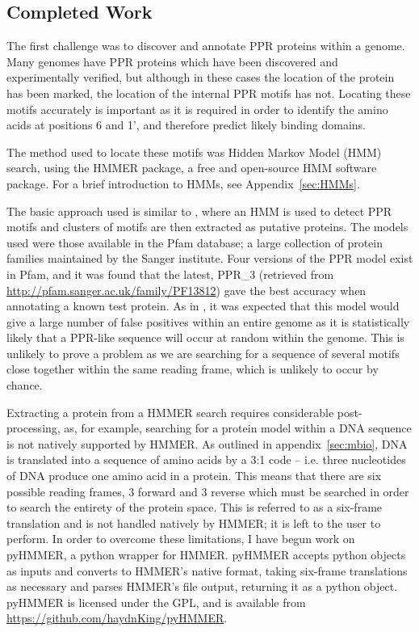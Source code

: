 \documentclass[twoside,a4paper]{article}
\begin{document}
\begin{multicols}{2}

\section{Completed Work}

The first challenge was to discover and annotate PPR proteins within a genome.
Many genomes have PPR proteins which have been discovered and experimentally
verified, but although in these cases the location of the protein has been
marked, the location of the internal PPR motifs has not.
Locating these motifs accurately is important as it is required in order to
identify the amino acids at positions 6 and 1', and therefore predict likely
binding domains.

The method used to locate these motifs was Hidden Markov Model (HMM) search, 
using the HMMER package, a free and open-source HMM software package.
For a brief introduction to HMMs, see Appendix~\ref{sec:HMMs}.

The basic approach used is similar to \cite{Lurin2004}, where an HMM is used to
detect PPR motifs and clusters of motifs are then extracted as putative
proteins.
The models used were those available in the Pfam database; a large collection
of protein families maintained by the Sanger institute.
Four versions of the PPR model exist in Pfam, and it was found that the latest,
PPR\_3 (retrieved from \url{http://pfam.sanger.ac.uk/family/PF13812}) gave the
best accuracy when annotating a known test protein.
As in \cite{Lurin2004}, it was expected that this model would give a large
number of false positives within an entire genome as it is statistically likely
that a PPR-like sequence will occur at random within the genome.
This is unlikely to prove a problem as we are searching for a sequence of
several motifs close together within the same reading frame, which is unlikely
to occur by chance.

Extracting a protein from a HMMER search requires considerable
post-processing, as, for example, searching for a protein model within
a DNA sequence is not natively supported by HMMER.
As outlined in appendix~\ref{sec:mbio}, DNA is translated into a sequence of
amino acids by a 3:1 code -- i.e. three nucleotides of DNA produce one amino
acid in a protein.
This means that there are six possible reading frames, 3 forward and 3 reverse
which must be searched in order to search the entirety of the protein space.
This is referred to as a six-frame translation and is not handled natively by
HMMER; it is left to the user to perform.
In order to overcome these limitations, I have begun work on pyHMMER, a python
wrapper for HMMER.
pyHMMER accepts python objects as inputs and converts to HMMER's
native format, taking six-frame translations as necessary and parses HMMER's
file output, returning it as a python object.
pyHMMER is licensed under the GPL, and is available from
\url{https://github.com/haydnKing/pyHMMER}.


\end{multicols}
\end{document}
